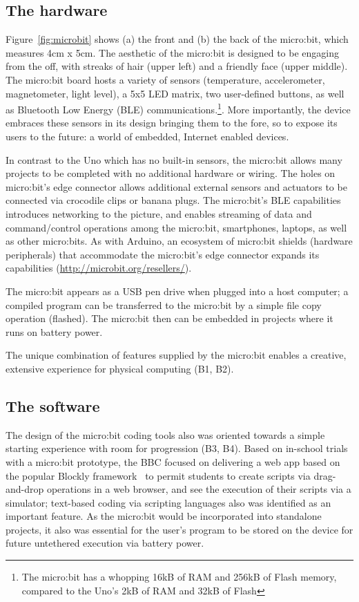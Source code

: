 \subsection{The hardware}

Figure~\ref{fig:microbit} shows (a) the front and (b) the back of the
micro:bit, which measures 4cm x 5cm. The aesthetic of the micro:bit is designed to be engaging from the off, with streaks of hair (upper left) and a friendly face (upper middle).
The micro:bit board hosts a variety of sensors (temperature, accelerometer, magnetometer,
light level), a 5x5 LED matrix, two user-defined buttons, as well as Bluetooth
Low Energy (BLE) communications.\footnote{The micro:bit has a whopping
16kB of RAM and 256kB of Flash memory, compared to the Uno's 2kB of
RAM and 32kB of Flash}. More importantly, the device embraces these sensors in its design bringing them to the fore, so to expose its users to the future: a world of embedded, Internet enabled devices.

In contrast to the Uno which has no built-in sensors, the micro:bit
allows many projects to be completed with no additional hardware or wiring.
The holes on micro:bit's edge connector allows additional external sensors and actuators to be connected via crocodile clips or banana plugs.
The micro:bit's BLE capabilities introduces networking to the
picture, and enables streaming of data and command/control operations among the micro:bit,
smartphones, laptops, as well as other micro:bits.
As with Arduino, an ecosystem of micro:bit shields
(hardware peripherals) that accommodate the micro:bit's edge
connector expands its capabilities (\url{http://microbit.org/resellers/}).

The micro:bit appears as a USB pen drive when plugged into a host computer;
a compiled program can be transferred to the micro:bit by a simple file copy
operation (flashed). The micro:bit then can be embedded in projects
where it runs on battery power.

The unique combination of features supplied by the micro:bit enables a creative,
extensive experience for physical computing (B1, B2).

\subsection{The software}

The design of the micro:bit coding tools also was oriented towards a
simple starting experience with room for progression (B3, B4). Based on in-school trials with a micro:bit prototype, the BBC focused on delivering a web app
based on the popular Blockly framework~\cite{Blocky2015} to permit students to
create scripts via drag-and-drop operations in a web browser, and see
the execution of their scripts via a simulator; text-based coding via scripting languages also
was identified as an important feature. As the micro:bit would be incorporated
into standalone projects, it also was essential for the user's program to be stored on the device for future untethered execution via battery power.

